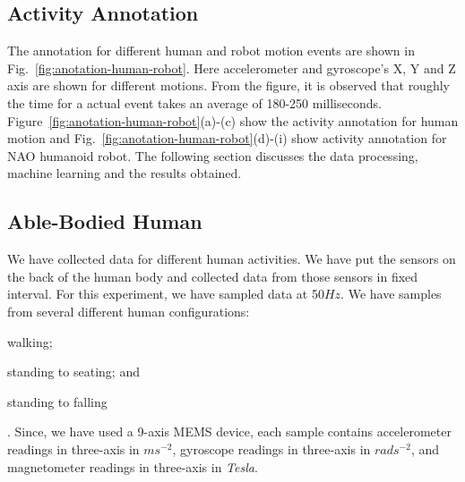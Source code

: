 \documentclass[letterpaper]{article}
\begin{document}
\subsection{Activity Annotation}

The annotation for different human and robot motion events are shown in Fig.{~\ref{fig:anotation-human-robot}}. Here accelerometer and gyroscope's X, Y and Z axis are shown for different motions. From the figure, it is observed that roughly  the time for a 
actual event takes an average of 180-250 milliseconds. Figure{~\ref{fig:anotation-human-robot}}(a)-(c) show the activity annotation for human motion and Fig.{~\ref{fig:anotation-human-robot}}(d)-(i) show activity annotation for NAO humanoid robot.  The following
section discusses the data processing, machine learning and
the results obtained.


\subsection{Able-Bodied Human}

We have collected data for different human activities. We have put the sensors on the back of the
human body and collected data from those sensors in fixed interval. For this experiment, we have
sampled data at 50$Hz$. We have samples from several different human configurations:
\begin{inparaenum}[(1)] \item walking; \item standing to seating;
and \item standing to falling\end{inparaenum}. Since, we have used a 9-axis MEMS device, each 
sample contains accelerometer readings in three-axis in $ms^{-2}$, gyroscope readings in 
three-axis in $rads^{-2}$, and magnetometer readings in three-axis in {\em Tesla}. 
\end{document}

